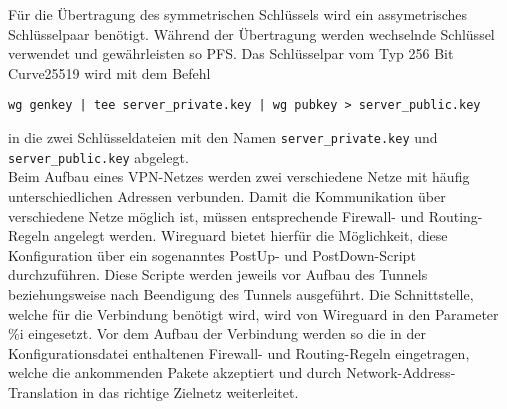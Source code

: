 \noindent F\"ur die \"Ubertragung des symmetrischen Schl\"ussels wird ein assymetrisches Schl\"usselpaar ben\"otigt. W\"ahrend der \"Ubertragung werden wechselnde Schl\"ussel verwendet und gew\"ahrleisten so \ac{PFS}. Das Schl\"usselpar vom Typ 256 Bit Curve25519 wird mit dem Befehl 
\begin{verbatim}
wg genkey | tee server_private.key | wg pubkey > server_public.key
\end{verbatim}
in die zwei Schl\"usseldateien mit den Namen \verb+server_private.key+ und \verb+server_public.key+ abgelegt.\\
Beim Aufbau eines VPN-Netzes werden zwei verschiedene Netze mit häufig unterschiedlichen Adressen verbunden. Damit die Kommunikation über verschiedene Netze möglich ist, müssen entsprechende Firewall- und Routing-Regeln angelegt werden. Wireguard bietet hierfür die Möglichkeit, diese Konfiguration über ein sogenanntes PostUp- und PostDown-Script durchzuführen. Diese Scripte werden jeweils vor Aufbau des Tunnels beziehungsweise nach Beendigung des Tunnels ausgeführt. Die Schnittstelle, welche für die Verbindung benötigt wird, wird von Wireguard in den Parameter \%i eingesetzt. Vor dem Aufbau der Verbindung werden so die in der Konfigurationsdatei enthaltenen Firewall- und Routing-Regeln eingetragen, welche die ankommenden Pakete akzeptiert und durch Network-Address-Translation in das richtige Zielnetz weiterleitet.  


